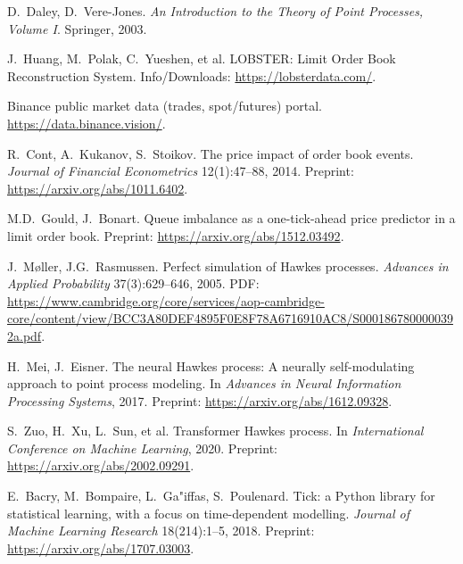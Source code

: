 \documentclass[11pt]{article}
\newcommand{\1}{\mathbbm{1}}
\begin{document}
\begin{thebibliography}{99}
D.~Daley, D.~Vere-Jones.
\emph{An Introduction to the Theory of Point Processes, Volume I}. Springer, 2003.

J.~Huang, M.~Polak, C.~Yueshen, et al.
LOBSTER: Limit Order Book Reconstruction System.
Info/Downloads: \url{https://lobsterdata.com/}.

Binance public market data (trades, spot/futures) portal.
\url{https://data.binance.vision/}.

R.~Cont, A.~Kukanov, S.~Stoikov.
The price impact of order book events.
\emph{Journal of Financial Econometrics} 12(1):47--88, 2014.
Preprint: \url{https://arxiv.org/abs/1011.6402}.

M.D.~Gould, J.~Bonart.
Queue imbalance as a one-tick-ahead price predictor in a limit order book.
Preprint: \url{https://arxiv.org/abs/1512.03492}.

J.~M{\o}ller, J.G.~Rasmussen.
Perfect simulation of Hawkes processes.
\emph{Advances in Applied Probability} 37(3):629--646, 2005.
PDF: \url{https://www.cambridge.org/core/services/aop-cambridge-core/content/view/BCC3A80DEF4895F0E8F78A6716910AC8/S0001867800000392a.pdf}.

H.~Mei, J.~Eisner.
The neural Hawkes process: A neurally self-modulating approach to point process modeling.
In \emph{Advances in Neural Information Processing Systems}, 2017.
Preprint: \url{https://arxiv.org/abs/1612.09328}.

S.~Zuo, H.~Xu, L.~Sun, et al.
Transformer Hawkes process.
In \emph{International Conference on Machine Learning}, 2020.
Preprint: \url{https://arxiv.org/abs/2002.09291}.

E.~Bacry, M.~Bompaire, L.~Ga"{i}ffas, S.~Poulenard.
Tick: a Python library for statistical learning, with a focus on time-dependent modelling.
\emph{Journal of Machine Learning Research} 18(214):1--5, 2018.
Preprint: \url{https://arxiv.org/abs/1707.03003}.

\end{thebibliography}
\end{document}
